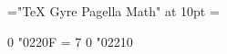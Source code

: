 \font\math="TeX Gyre Pagella Math" at 10pt
=\math


\Umathchardef{} 0 "0220F
\Umathchardef\beta= 7 0 "02210


